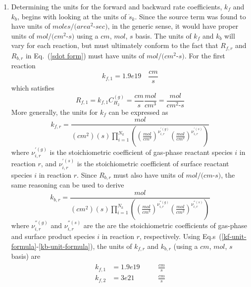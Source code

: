 \documentclass{report}
\newcommand{\eref}[1]{Eq.~(\ref{#1})}
\newcommand{\erefs}[2]{Eq.s~(\ref{#1}-\ref{#2})}
\newcommand{\sk}{\dot{s}_k}
\newcommand{\kf}[1]{k_{f,#1}}
\newcommand{\kb}[1]{k_{b,#1}}
\newcommand{\cg}[1]{{C_{#1}^{(g)}}}
\begin{document}
\begin{enumerate}[label=(\alph*)]
  \item Determining the units for the forward and backward rate coefficients,
  $k_f$ and $k_b$, begins with looking at the units of $\sk$.  Since the source
  term was found to have units of $moles/(area^2$-$sec)$, in the generic sense, it
  would have proper units of $mol/(cm^2$-$s)$ using a $cm$, $mol$, $s$ basis.
  The units of $k_f$ and $k_b$ will vary for each reaction, but must ultimately
  conform to the fact that $R_{f,r}$ and $R_{b,r}$ in \eref{sdot form} must have
  units of $mol/(cm^2$-$s)$.  For the first reaction
  \begin{equation}
    \kf{1} = 1.9e19 \quad \frac{cm}{s}
    \label{kf_units}
  \end{equation}
  which satisfies
  \begin{equation}
    R_{f,1} = k_{f,1}\cg{H_2} = \frac{cm}{s}\frac{mol}{cm^3} =
    \frac{mol}{cm^2\text{-}s}
    \label{R_units}
  \end{equation}
 More generally, the units for $k_f$ can be expressed as
  \begin{equation}
    \kf{r} = \frac{mol}{(cm^2)(s)\prod_{i=1}^{N_k}\left(
    \left( \frac{mol}{cm^3} \right)^{\nu_{i,r}^{'(g)}} \left( \frac{mol}{cm^2}
    \right)^{\nu_{i,r}^{'(s)}} \right)}
    \label{kf-unit-formula}
  \end{equation}
  where $\nu_{i,r}^{'(g)}$ is the stoichiometric coefficient of gas-phase
  reactant species $i$ in reaction $r$, and $\nu_{i,r}^{'(s)}$ is the
  stoichiometric coefficient of surface reactant species $i$ in reaction $r$.
  Since $R_{b,r}$ must also have units of $mol/(cm$-$s)$, the same reasoning can
  be used to derive
  \begin{equation}
    \kb{r} = \frac{mol}{(cm^2)(s)\prod_{i=1}^{N_k}\left(
    \left( \frac{mol}{cm^3} \right)^{\nu_{i,r}^{''(g)}} \left( \frac{mol}{cm^2}
    \right)^{\nu_{i,r}^{''(s)}} \right)}
    \label{kb-unit-formula}
  \end{equation}
  where $\nu_{i,r}^{''(g)}$ and $\nu_{i,r}^{''(s)}$ are the are the
  stoichiometric coefficients of gas-phase and surface product species $i$ in
  reaction $r$, respectively.  Using \erefs{kf-unit-formula}{kb-unit-formula},
  the units of $\kf{r}$ and $\kb{r}$ (using a $cm$, $mol$, $s$ basis) are
  \begin{align}
    \begin{alignedat}{2}
      \kf{1} &= 1.9e19 && \quad \frac{cm}{s} \\
      \kf{2} &= 3e21   && \quad \frac{cm}{s} \\

\end{alignedat}
\end{align}
\end{enumerate}
\end{document}
